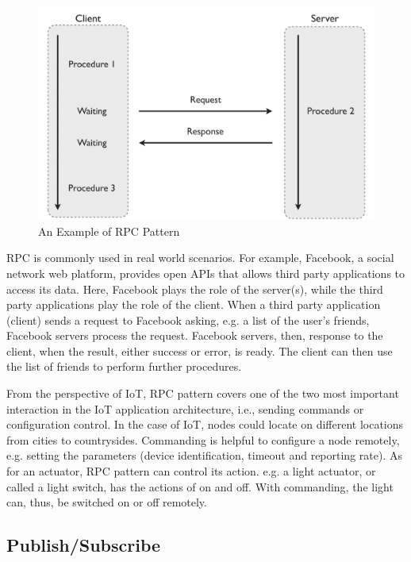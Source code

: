 \begin{figure}[t]
  \begin{center}
    \includegraphics[width=1\textwidth]{images/RPC-pattern.pdf}
    \caption{An Example of RPC Pattern}
    \label{fig:RPC-pattern}
  \end{center}
\end{figure}

RPC is commonly used in real world scenarios. For example, Facebook, a social network web platform, provides open APIs that allows third party applications to access its data. Here, Facebook plays the role of the server(s), while the third party applications play the role of the client. When a third party application (client) sends a request to Facebook asking, e.g. a list of the user's friends, Facebook servers process the request. Facebook servers, then, response to the client, when the result, either success or error, is ready. The client can then use the list of friends to perform further procedures. 

From the perspective of IoT, RPC pattern covers one of the two most important interaction in the IoT application architecture, i.e., sending commands or configuration control. In the case of IoT, nodes could locate on different locations from cities to countrysides. Commanding is helpful to configure a node remotely, e.g. setting the parameters (device identification, timeout and reporting rate). As for an actuator, RPC pattern can control its action. e.g. a light actuator, or called a light switch, has the actions of on and off. With commanding, the light can, thus, be switched on or off remotely.

\subsection{Publish/Subscribe}

